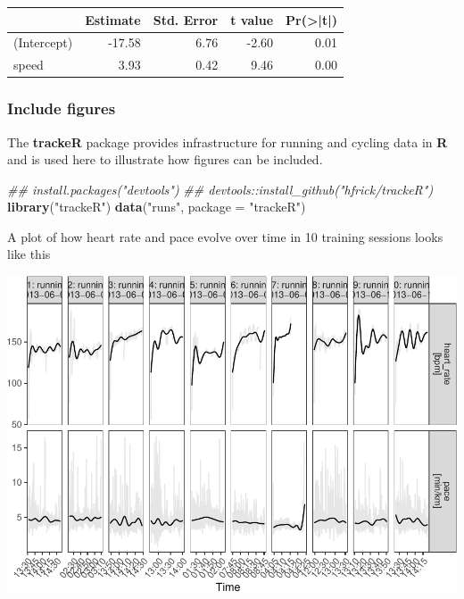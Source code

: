 \documentclass[]{book}
\newenvironment{Shaded}{\begin{snugshade}}{\end{snugshade}}
\newcommand{\CommentTok}[1]{\textcolor[rgb]{0.56,0.35,0.01}{\textit{#1}}}
\newcommand{\DataTypeTok}[1]{\textcolor[rgb]{0.13,0.29,0.53}{#1}}
\newcommand{\KeywordTok}[1]{\textcolor[rgb]{0.13,0.29,0.53}{\textbf{#1}}}
\newcommand{\NormalTok}[1]{#1}
\newcommand{\StringTok}[1]{\textcolor[rgb]{0.31,0.60,0.02}{#1}}
\begin{document}
\begin{tabular}{l|r|r|r|r}
\hline
  & Estimate & Std. Error & t value & Pr(>|t|)\\
\hline
(Intercept) & -17.58 & 6.76 & -2.60 & 0.01\\
\hline
speed & 3.93 & 0.42 & 9.46 & 0.00\\
\hline
\end{tabular}

\hypertarget{include-figures}{%
\subsubsection{Include figures}\label{include-figures}}

The \textbf{trackeR} package provides infrastructure for running and cycling data in \textbf{R} and is used here to illustrate how figures can be included.

\begin{Shaded}
\begin{Highlighting}[]
\CommentTok{## install.packages("devtools")}
\CommentTok{## devtools::install_github("hfrick/trackeR")}
\KeywordTok{library}\NormalTok{(}\StringTok{"trackeR"}\NormalTok{) }
\KeywordTok{data}\NormalTok{(}\StringTok{"runs"}\NormalTok{, }\DataTypeTok{package =} \StringTok{"trackeR"}\NormalTok{)}
\end{Highlighting}
\end{Shaded}

A plot of how heart rate and pace evolve over time in 10 training sessions looks like this

\includegraphics{code4stem_files/figure-latex/unnamed-chunk-4-1.pdf}
\end{document}

